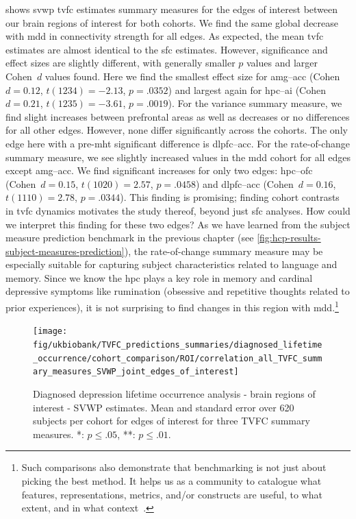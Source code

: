 shows \gls{svwp} \gls{tvfc} estimates summary measures for the edges of interest between our brain regions of interest for both cohorts.
%
We find the same global decrease with \gls{mdd} in connectivity strength for all edges.
As expected, the mean \gls{tvfc} estimates are almost identical to the \gls{sfc} estimates.
However, significance and effect sizes are slightly different, with generally smaller $p$ values and larger Cohen~$d$ values found.
Here we find the smallest effect size for \gls{amg}--\gls{acc} (Cohen~$d = 0.12$, $t(1234) = -2.13$, $p = .0352$) and largest again for \gls{hpc}--\gls{ai} (Cohen~$d = 0.21$, $t(1235) = -3.61$, $p = .0019$).
%
For the variance summary measure, we find slight increases between prefrontal areas as well as decreases or no differences for all other edges.
However, none differ significantly across the cohorts.
The only edge here with a pre-\gls{mht} significant difference is \gls{dlpfc}--\gls{acc}.
%
For the rate-of-change summary measure, we see slightly increased values in the \gls{mdd} cohort for all edges except \gls{amg}--\gls{acc}.
We find significant increases for only two edges: \gls{hpc}--\gls{ofc} (Cohen~$d = 0.15$, $t(1020) = 2.57$, $p = .0458$) and \gls{dlpfc}--\gls{acc} (Cohen~$d = 0.16$, $t(1110) = 2.78$, $p = .0344$).
This finding is promising; finding cohort contrasts in \gls{tvfc} dynamics motivates the study thereof, beyond just \gls{sfc} analyses.
How could we interpret this finding for these two edges?
As we have learned from the subject measure prediction benchmark in the previous chapter (see \cref{fig:hcp-results-subject-measures-prediction}), the rate-of-change summary measure may be especially suitable for capturing subject characteristics related to language and memory.
Since we know the \gls{hpc} plays a key role in memory and cardinal depressive symptoms like rumination (obsessive and repetitive thoughts related to prior experiences), it is not surprising to find changes in this region with \gls{mdd}.\footnote{Such comparisons also demonstrate that benchmarking is not just about picking the best method. It helps us as a community to catalogue what features, representations, metrics, and/or constructs are useful, to what extent, and in what context~\parencite[see also][]{Voytek2022}.}


\begin{figure}[t]
  \centering
  \texttt{[image: fig/ukbiobank/TVFC\_predictions\_summaries/diagnosed\_lifetime\_occurrence/cohort\_comparison/ROI/correlation\_all\_TVFC\_summary\_measures\_SVWP\_joint\_edges\_of\_interest]}
  \caption{
    Diagnosed depression lifetime occurrence analysis - brain regions of interest - SVWP estimates.
    Mean and standard error over 620 subjects per cohort for edges of interest for three TVFC summary measures.
    *: $p \leq .05$, **: $p \leq .01$.
  }\label{fig:ukb-results-dlo-roi-cohort-comparison-edges-of-interest-wp}
\end{figure}


